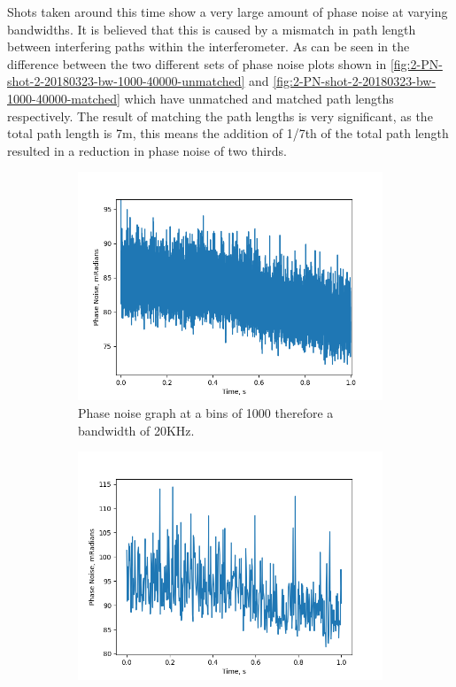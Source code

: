 \documentclass[12pt,a4paper,oneside]{report}
\begin{document}
Shots taken around this time show a very large amount of phase noise at varying bandwidths. It is believed that this is caused by a mismatch in path length between interfering paths within the interferometer. As can be seen in the difference between the two different sets of phase noise plots shown in \autoref{fig:2-PN-shot-2-20180323-bw-1000-40000-unmatched} and \autoref{fig:2-PN-shot-2-20180323-bw-1000-40000-matched} which have unmatched and matched path lengths respectively. The result of matching the path lengths is very significant, as the total path length is 7m, this means the addition of 1/7th of the total path length resulted in a reduction in phase noise of two thirds.
\begin{figure}
  \begin{subfigure}{.5\textwidth}
    \centering\captionsetup{width=.9\linewidth}
    \includegraphics[width=\textwidth,angle=0]{DImages/Phase_Noise_for_Scene_shot_2_with_bandwidth___1000_Date_20180323.png}
    \caption{Phase noise graph at a bins of 1000 therefore a bandwidth of 20KHz.}
  \end{subfigure}
  \begin{subfigure}{.5\textwidth}
    \centering\captionsetup{width=.9\linewidth}
    \includegraphics[width=\textwidth, angle=0]{DImages/Phase_Noise_for_Scene_shot_2_with_bandwidth___40000_Date_20180323.png}

\end{subfigure}
\end{figure}
\end{document}
